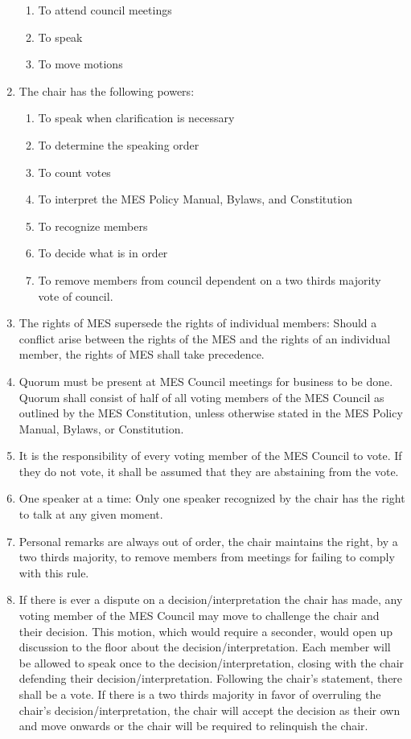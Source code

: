 \begin{enumerate}
  \begin{enumerate}
   \item
    To attend council meetings
   \item
    To speak
   \item
    To move motions
  \end{enumerate}
 \item
  The chair has the following powers:

  \begin{enumerate}
   \item
    To speak when clarification is necessary
   \item
    To determine the speaking order
   \item
    To count votes
   \item
    To interpret the MES Policy Manual, Bylaws, and Constitution
   \item
    To recognize members
   \item
    To decide what is in order
   \item
    To remove members from council dependent on a two thirds majority vote of council. %
  \end{enumerate}
 \item
  The rights of MES supersede the rights of individual members: Should a conflict arise between the rights of the MES and the rights of an individual member, the rights of MES shall take precedence.
 \item
  Quorum must be present at MES Council meetings for business to be done. Quorum shall consist of half of all voting members of the MES Council as outlined by the MES Constitution, unless otherwise stated in the MES Policy Manual, Bylaws, or Constitution.
 \item
  It is the responsibility of every voting member of the MES Council to vote. If they do not vote, it shall be assumed that they are abstaining from the vote.
 \item
  One speaker at a time: Only one speaker recognized by the chair has the right to talk at any given moment.
 \item
  Personal remarks are always out of order, the chair maintains the right, by a two thirds majority, to remove members from meetings for failing to comply with this rule.
 \item
  If there is ever a dispute on a decision/interpretation the chair has made, any voting member of the MES Council may move to challenge the chair and their decision. This motion, which would require a seconder, would open up discussion to the floor about the decision/interpretation. Each member will be allowed to speak once to the decision/interpretation, closing with the chair defending their decision/interpretation. Following the chair's statement, there shall be a vote. If there is a two thirds majority in favor of overruling the chair's decision/interpretation, the chair will accept the decision as their own and move onwards or the chair will be required to relinquish the chair.

\end{enumerate}

